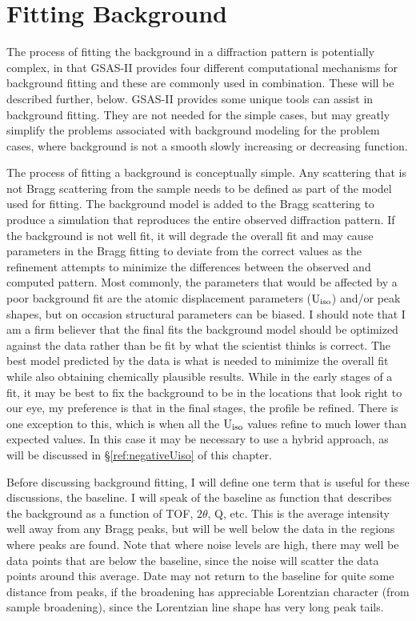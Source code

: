 \chapter{Fitting Background}
\label{Chap:background}

The process of fitting the background in a diffraction pattern is potentially complex, in that GSAS-II provides four different computational mechanisms for background fitting and these are commonly used in combination. These will be described further, below. GSAS-II provides some unique tools can assist in background fitting. They are not needed for the simple cases, but may greatly simplify the problems associated with background modeling for the problem cases, where background is not a smooth slowly increasing or decreasing function.

The process of fitting a background is conceptually simple. Any scattering that is not Bragg scattering from the sample needs to be defined as part of the model used for fitting. The background model is added to the Bragg scattering to produce a simulation that reproduces the entire observed diffraction pattern. If the background is not well fit, it will degrade the overall fit and may cause parameters in the Bragg fitting to deviate from the correct values as the refinement attempts to minimize the differences between the observed and computed pattern. Most commonly, the parameters that would be affected by a poor background fit are the atomic displacement parameters ($\rm U_{iso}$) and/or peak shapes, but on occasion structural parameters can be biased. I should note that I am a firm believer that the final fits the background model should be optimized against the data rather than be fit by what the scientist thinks is correct. The best model predicted by the data is what is needed to minimize the overall fit while also obtaining chemically plausible results. While in the early stages of a fit, it may be best to fix the background to be in the locations that look right to our eye, my preference is that in the final stages, the profile be refined. There is one exception to this, which is when all the $\rm U_{iso}$ values refine to much lower than expected values. In this case it may be necessary to use a hybrid approach, as will be discussed in \S\ref{ref:negativeUiso} of this chapter.

Before discussing background fitting, I will define one term that is useful for these discussions, the baseline. I will speak of the baseline as function that describes the background as a function of TOF, $2\theta$, Q, etc. This is the average intensity well away from any Bragg peaks, but will be well below the data in the regions where peaks are found. Note that where noise levels are high, there may well be data points that are below the baseline, since the noise will scatter the data points around this average. Date may not return to the baseline for quite some distance from peaks, if the broadening has appreciable Lorentzian character (from sample broadening), since the Lorentzian line shape has very long peak tails. 

